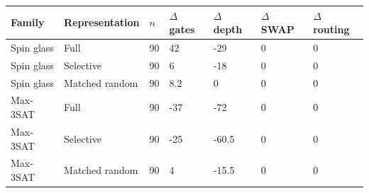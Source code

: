 \begin{tabular}{lllllll}
\hline
Family & Representation & $n$ & $\Delta$ gates & $\Delta$ depth & $\Delta$ SWAP & $\Delta$ routing \\
\hline
Spin glass & Full & 90 & 42 & -29 & 0 & 0 \\
Spin glass & Selective & 90 & 6 & -18 & 0 & 0 \\
Spin glass & Matched random & 90 & 8.2 & 0 & 0 & 0 \\
Max-3SAT & Full & 90 & -37 & -72 & 0 & 0 \\
Max-3SAT & Selective & 90 & -25 & -60.5 & 0 & 0 \\
Max-3SAT & Matched random & 90 & 4 & -15.5 & 0 & 0 \\
\hline
\end{tabular}
